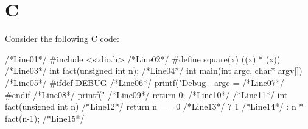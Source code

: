  \section{C}
Consider the following C code:

 \begin{examplecode}
/*Line01*/  #include <stdio.h>
/*Line02*/  #define square(x) ((x) * (x))
/*Line03*/  int fact(unsigned int n);
/*Line04*/  int main(int argc, char* argv[]){
/*Line05*/  #ifdef DEBUG
/*Line06*/    printf("Debug - argc = %
/*Line07*/  #endif
/*Line08*/   printf("%
/*Line09*/    return 0;
/*Line10*/  }
/*Line11*/  int fact(unsigned int n){
/*Line12*/    return n == 0
/*Line13*/      ? 1
/*Line14*/      : n * fact(n-1);
/*Line15*/  }
 \end{examplecode}

